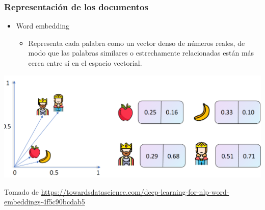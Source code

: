 \documentclass[
10pt, %
aspectratio=169, %
]{beamer}
\begin{document}
	\begin{frame}
		
		\frametitle{Representación de los documentos}
		
		\begin{itemize}
			\item Word embedding
			
			\begin{itemize}
				\item Representa cada palabra como un vector denso de números reales, de modo que las palabras similares o estrechamente relacionadas están más cerca entre sí en el espacio vectorial.
				
			\end{itemize}
			
		\end{itemize}
		
		\pause
		
		\centering
		\includegraphics[scale=0.25]{word-embedding.png}
		
		{\scriptsize Tomado de \url{https://towardsdatascience.com/deep-learning-for-nlp-word-embeddings-4f5c90bcdab5}}
		
	\end{frame}
	
	
\end{document}
